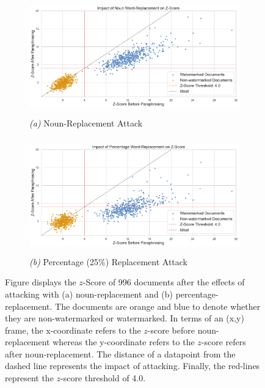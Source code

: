\documentclass{l4proj}
\theoremstyle{definition}
\begin{document}
    \begin{figure}[ht]
            \centering
            \captionsetup[subfigure]{labelformat=empty}
            \begin{subfigure}{\textwidth}
                \centering
                \includegraphics[height=5cm, width=\linewidth, keepaspectratio]{images/results/z-score/noun word-replacement.pdf}
                \caption{\emph{(a)} Noun-Replacement Attack}
                \label{fig:noun-replacement-z-score}
            \end{subfigure}
            \begin{subfigure}{\textwidth}
                \centering
                \includegraphics[height=5cm, width=\linewidth, keepaspectratio]{images/results/z-score/percentage word-replacement.pdf}
                \caption{\emph{(b)} Percentage (25\%) Replacement Attack}
                \label{fig:percentage-replacement-z-score}
            \end{subfigure}
            \caption{Figure displays the $z$-Score of 996 documents after the effects of attacking with (a) noun-replacement and (b) percentage-replacement. The documents are orange and blue to denote whether they are non-watermarked or watermarked. In terms of an (x,y) frame, the x-coordinate refers to the $z$-score before noun-replacement whereas the y-coordinate refers to the $z$-score refers after noun-replacement. The distance of a datapoint from the dashed line represents the impact of attacking. Finally, the red-lines represent the $z$-score threshold of 4.0.}
            \label{fig:kpar3-sample-comparison}
    \end{figure}
\end{document}
